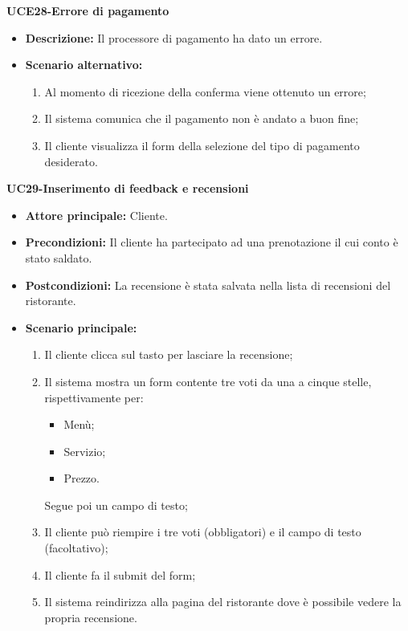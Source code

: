 \textbf{UCE28-Errore di pagamento}
\begin{itemize}
\item \textbf{Descrizione: } Il processore di pagamento ha dato un errore.
\item \textbf{Scenario alternativo:}
\begin{enumerate}
    \item Al momento di ricezione della conferma viene ottenuto un errore;
    \item Il sistema comunica che il pagamento non è andato a buon fine;
    \item Il cliente visualizza il form della selezione del tipo di pagamento desiderato.
\end{enumerate}
\end{itemize}

\textbf{UC29-Inserimento di feedback e recensioni}
\begin{itemize}
\item \textbf{Attore principale:} Cliente.
\item \textbf{Precondizioni:} Il cliente ha partecipato ad una prenotazione il cui conto è stato saldato.
\item \textbf{Postcondizioni:} La recensione è stata salvata nella lista di recensioni del ristorante.
\item \textbf{Scenario principale:}
\begin{enumerate}
    \item Il cliente clicca sul tasto per lasciare la recensione;
    \item Il sistema mostra un form contente tre voti da una a cinque stelle, rispettivamente per:
  \begin{itemize}
    \item Menù;
    \item Servizio;
    \item Prezzo.
  \end{itemize}
      Segue poi un campo di testo;
    \item Il cliente può riempire i tre voti (obbligatori) e il campo di testo (facoltativo);
    \item Il cliente fa il submit del form;
    \item Il sistema reindirizza alla pagina del ristorante dove è possibile vedere la propria recensione.
\end{enumerate}
\end{itemize}

